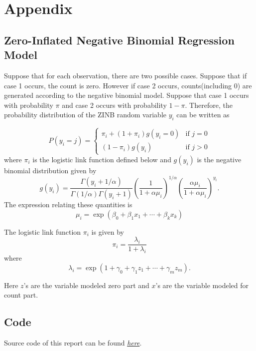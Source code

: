 \documentclass[
]{article}
\begin{document}
\hypertarget{appendix}{%
\section{Appendix}\label{appendix}}

\hypertarget{zero-inflated-negative-binomial-regression-model}{%
\subsection{Zero-Inflated Negative Binomial Regression
Model}\label{zero-inflated-negative-binomial-regression-model}}

Suppose that for each observation, there are two possible cases. Suppose
that if case 1 occurs, the count is zero. However if case 2 occurs,
counts(including 0) are generated according to the negative binomial
model. Suppose that case 1 occurs with probability \(\pi\) and case 2
occurs with probability \(1-\pi\). Therefore, the probability
distribution of the ZINB random variable \(y_i\) can be written as

\[
P(y_i = j) = 
\begin{cases}
\pi_i + (1+\pi_i) g(y_i=0) & \text{if }j=0 \\
(1-\pi_i) g(y_i)           & \text{if }j>0
\end{cases}
\] where \(\pi_i\) is the logistic link function defined below and
\(g(y_i)\) is the negative binomial distribution given by \[
g(y_i) = \frac{\Gamma(y_i + 1/\alpha)}{\Gamma(1/\alpha) \Gamma(y_i+1)}\left( \frac{1}{1 + \alpha \mu_i}\right)^{1/\alpha}\left( \frac{\alpha \mu_i}{1 + \alpha \mu_i}\right)^{y_i}.
\] The expression relating these quantities is \[
\mu_i = \exp(\beta_0 + \beta_1 x_1 + \cdots + \beta_k x_k)
\]

The logistic link function \(\pi_i\) is given by \[
\pi_i = \frac{\lambda_i}{1 + \lambda_i}
\] where \[
\lambda_i = \exp(1 + \gamma_0 + \gamma_1 z_1 + \cdots + \gamma_m z_m).
\]

Here \(z\)'s are the variable modeled zero part and \(x\)'s are the
variable modeled for count part.

\hypertarget{code}{%
\subsection{Code}\label{code}}

Source code of this report can be found
\href{https://github.com/ZhihaoXu/Stats504/blob/main/Assignment/assignment_1/stats504_hw1.Rmd}{\emph{here}}.
\end{document}
